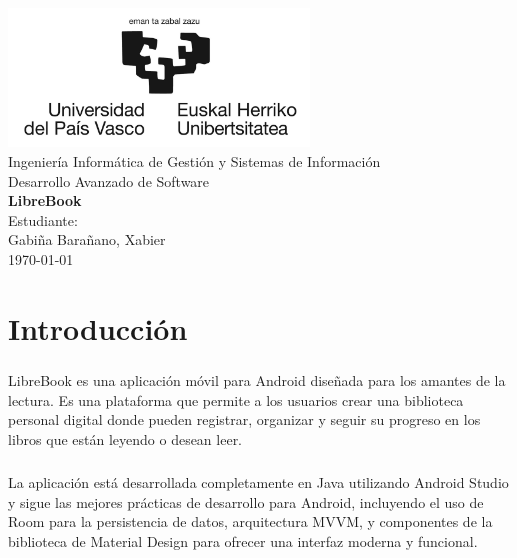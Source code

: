 \documentclass[a4paper,12pt]{report}
\begin{document}
  \begin{titlepage}
      \centering
      \includegraphics[width=0.6\textwidth]{./.img/logo.jpg}\\
      \vspace{1cm}
      \Large Ingeniería Informática de Gestión y Sistemas de Información\\
      \vspace{3cm}
      \Huge Desarrollo Avanzado de Software\\
      \vspace{0.5cm}
      \huge \textbf{LibreBook}\\
      \vspace{7.5cm}
      \Large Estudiante:\\
      \vspace{0.2cm}
      \large Gabiña Barañano, Xabier\\
      \vspace{1cm}
      \vfill
      \today
  \end{titlepage}
  \tableofcontents
  \listoffigures
  \listoftables
  \lstlistoflistings
  \chapter{Introducción}
    \paragraph*{}{
      LibreBook es una aplicación móvil para Android diseñada para los amantes de la lectura. Es una plataforma que permite a los usuarios crear una biblioteca personal digital donde pueden registrar, organizar y seguir su progreso en los libros que están leyendo o desean leer.
    }
    \paragraph*{}{
      La aplicación está desarrollada completamente en Java utilizando Android Studio y sigue las mejores prácticas de desarrollo para Android, incluyendo el uso de Room para la persistencia de datos, arquitectura MVVM, y componentes de la biblioteca de Material Design para ofrecer una interfaz moderna y funcional.
    }
\end{document}
